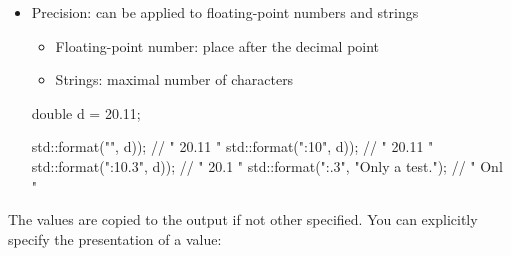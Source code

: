 \begin{itemize}
\item 
Precision: can be applied to floating-point numbers and strings

\begin{itemize}
\item 
Floating-point number: place after the decimal point

\item 
Strings: maximal number of characters
\end{itemize}

\begin{cpp}
double d = 20.11;

std::format("{}", d)); // " 20.11 "
std::format("{:10}", d)); // " 20.11 "
std::format("{:10.3}", d)); // " 20.1 "
std::format("{:.3}", "Only a test."); // " Onl "
\end{cpp}

\end{itemize}


The values are copied to the output if not other specified. You can explicitly specify the presentation of a value:

